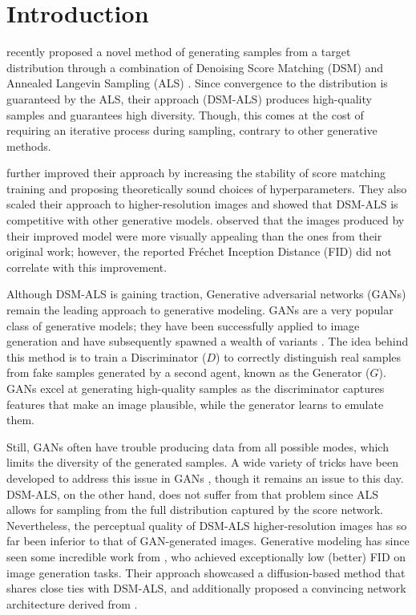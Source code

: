 \documentclass{article} \usepackage{iclr2021_conference_notitle,times}
\theoremstyle{definition}
\theoremstyle{definition}
\begin{document}
\section{Introduction}

\citet{song2019generative} recently proposed a novel method of generating samples from a target distribution through a combination of Denoising Score Matching (DSM) \citep{hyvarinen2005estimation, vincent2011connection, raphan2011least} and Annealed Langevin Sampling (ALS) \citep{welling2011bayesian,roberts1996exponential}. 
Since convergence to the distribution is guaranteed by the ALS, their approach (DSM-ALS) produces high-quality samples and guarantees high diversity. Though, this comes at the cost of requiring an iterative process during sampling, contrary to other generative methods.


\citet{song2020improved} further improved their approach by increasing the stability of score matching training and proposing theoretically sound choices of hyperparameters. They also scaled their approach to higher-resolution images and showed that DSM-ALS is competitive with other generative models.
\citet{song2020improved} observed that the images produced by their improved model were more visually appealing than the ones from their original work;
however, the reported Fréchet Inception Distance (FID) \citep{heusel2017gans} did not correlate with this improvement. 

Although DSM-ALS is gaining traction, Generative adversarial networks (GANs) \citep{GAN} remain the leading approach to generative modeling. GANs are a very popular class of generative models; they have been successfully applied to image generation \citep{brock2018large,karras2017progressive,karras2019style,karras2020analyzing} and have subsequently spawned a wealth of variants \citep{radford2015unsupervised,miyato2018spectral,jolicoeur2018relativistic,zhang2019self}. The idea behind this method is to train a Discriminator ($D$) to correctly distinguish real samples from fake samples generated by a second agent, known as the Generator ($G$). GANs excel at generating high-quality samples as the discriminator captures features that make an image plausible, while the generator learns to emulate them.

Still, GANs often have trouble producing data from all possible modes, which limits the diversity of the generated samples. A wide variety of tricks have been developed to address this issue in GANs \citep{kodali2017convergence,WGAN-GP,WGAN,miyato2018spectral,jolicoeur2019connections}, though it remains an issue to this day. DSM-ALS, on the other hand, does not suffer from that problem since ALS allows for sampling from the full distribution captured by the score network. Nevertheless, the perceptual quality of DSM-ALS higher-resolution images has so far been inferior to that of GAN-generated images. Generative modeling has since seen some incredible work from \citet{ho2020denoising}, who achieved exceptionally low (better) FID on image generation tasks. Their approach showcased a diffusion-based method \citep{sohl2015deep, goyal2017variational} that shares close ties with DSM-ALS, and additionally proposed a convincing network architecture derived from \citet{salimans2017pixelcnn++}.
\end{document}
